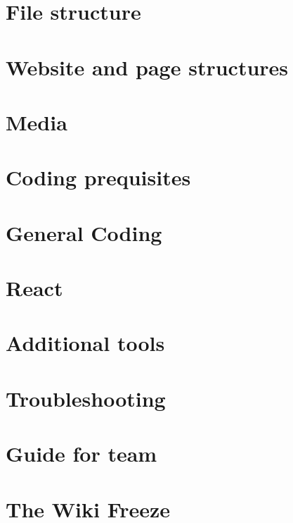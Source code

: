 \documentclass[a4paper, 11pt, twoside]{book}
\begin{document}
\chapter{File structure} \label{ch:structure}

\newpage
%
\chapter{Website and page structures} \label{ch:webstructure}
%
\newpage
%
\chapter{Media}\label{ch:media}
%
\newpage
%
\chapter{Coding prequisites} \label{ch:cod}
%
\newpage
%
\chapter{General Coding}  \label{ch:coding}
%
\newpage
%
\chapter{React} \label{ch:react}
%
%
\newpage
%
\chapter{Additional tools} \label{ch:addtools}
%
\newpage
%
\chapter{Troubleshooting} \label{ch:troubleshooting}
%
\newpage
%
\chapter{Guide for team} \label{ch:guide}
%
\newpage
%
\chapter{The Wiki Freeze}  \label{ch:freeze}
%
\newpage
%
\end{document}
